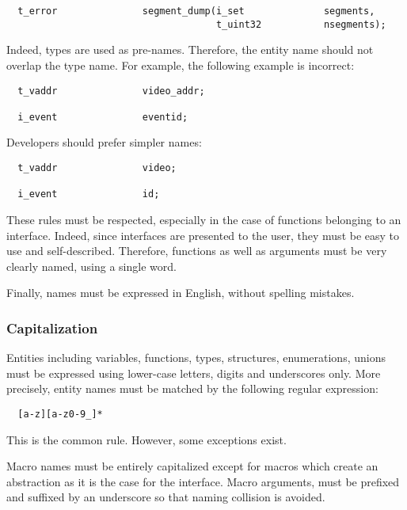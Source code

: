 \begin{verbatim}
  t_error               segment_dump(i_set              segments,
                                     t_uint32           nsegments);
\end{verbatim}

Indeed, types are used as pre-names. Therefore, the entity name should
not overlap the type name. For example, the following example is incorrect:

\begin{verbatim}
  t_vaddr               video_addr;

  i_event               eventid;
\end{verbatim}

Developers should prefer simpler names:

\begin{verbatim}
  t_vaddr               video;

  i_event               id;
\end{verbatim}

These rules must be respected, especially in the case of functions belonging
to an interface. Indeed, since interfaces are presented to the user, they
must be easy to use and self-described. Therefore, functions as well as
arguments must be very clearly named, using a single word.

Finally, names must be expressed in English, without spelling mistakes.


\subsubsection{Capitalization}

Entities including variables, functions, types, structures, enumerations,
unions \etc{} must be expressed using lower-case letters, digits and
underscores only. More precisely, entity names must be matched by the following
regular expression:

\begin{verbatim}
  [a-z][a-z0-9_]*
\end{verbatim}

This is the common rule. However, some exceptions exist.

Macro names must be entirely capitalized except for macros which create
an abstraction as it is the case for the  interface. Macro
arguments, must be prefixed and suffixed by an underscore so that naming
collision is avoided.

